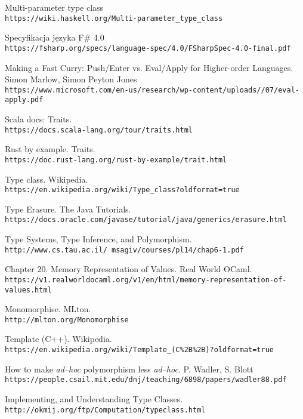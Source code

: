 \documentclass[declaration,shortabstract]{iithesis}
\begin{document}
\begin{thebibliography}{1}
Multi-parameter type class
\\\texttt{https://wiki.haskell.org/Multi-parameter\_type\_class}

Specyfikacja języka F\# 4.0
\\\texttt{https://fsharp.org/specs/language-spec/4.0/FSharpSpec-4.0-final.pdf}

Making a Fast Curry: Push/Enter vs.
Eval/Apply for Higher-order Languages. Simon Marlow, Simon Peyton Jones
\\\texttt{https://www.microsoft.com/en-us/research/wp-content/uploads//07/eval-apply.pdf}

Scala docs: Traits.
\\\texttt{https://docs.scala-lang.org/tour/traits.html}

Rust by example. Traits.
\\\texttt{https://doc.rust-lang.org/rust-by-example/trait.html}

Type class. Wikipedia.
\\\texttt{https://en.wikipedia.org/wiki/Type\_class?oldformat=true}

Type Erasure. The Java Tutorials.
\\\texttt{https://docs.oracle.com/javase/tutorial/java/generics/erasure.html}

Type Systems, Type Inference, and Polymorphism.
\\\texttt{http://www.cs.tau.ac.il/~msagiv/courses/pl14/chap6-1.pdf}

Chapter 20. Memory Representation of Values. Real World OCaml.
\\\texttt
{https://v1.realworldocaml.org/v1/en/html/memory-representation-of-values.html}

Monomorphise. MLton.
\\\texttt
{http://mlton.org/Monomorphise}

Template (C++). Wikipedia.
\\\texttt
{https://en.wikipedia.org/wiki/Template\_(C\%2B\%2B)?oldformat=true}

How to make \textit{ad--hoc} polymorphism less \textit{ad--hoc}. 
P. Wadler, S. Blott
\\\texttt
{https://people.csail.mit.edu/dnj/teaching/6898/papers/wadler88.pdf}

Implementing, and Understanding Type Classes.
\\\texttt
{http://okmij.org/ftp/Computation/typeclass.html}

\end{thebibliography}
\end{document}
